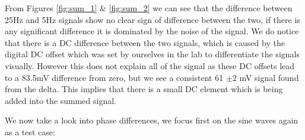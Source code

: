 From Figures \ref{fig:sum_1} \& \ref{fig:sum_2} we can see that the difference between 25Hz and 5Hz signals show no clear sign of difference between the two, if there is any significant difference it is dominated by the noise of the signal. We do notice that there is a DC difference between the two signals, which is caused by the digital DC offset which was set by ourselves in the lab to differentiate the signals visually. However this does not explain all of the signal as these DC offsets lead to a 83.5mV difference from zero, but we see a consistent 61 $\pm 2$ mV signal found from the delta. This implies that there is a small DC element which is being added into the summed signal. 


We now take a look into phase differences, we focus first on the sine waves again as a test case:


